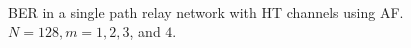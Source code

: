 \begin{figure}
{	 \\
}
\caption{BER in a single path relay network with HT channels using AF.  $N = 128, m = 1, 2, 3$, and $4$.}
\label{fig:sp_af_ber_plots_HT}
\end{figure}

